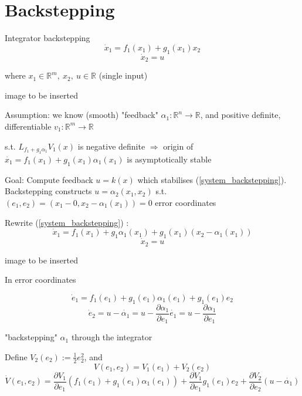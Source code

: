 \section{Backstepping}

Integrator backstepping 
\begin{equation}\label{system_backstepping}
\dot x_1 = f_1(x_1) + g_1(x_1)x_2 
\end{equation}
\begin{equation*}
\dot x_2 = u
\end{equation*}

where $x_1 \in \mathbb{R}^m, \ x_2, \ u \in \mathbb{R}$ (single input)

image to be inserted

Assumption: we know (smooth) "feedback" $\alpha_1: \mathbb{R}^n \to \mathbb{R}$, and positive definite, differentiable $v_1: \mathbb{R}^m \to \mathbb{R}$

s.t. $L_{f_1 + g_1\alpha_1}V_1(x)$ is negative definite $\Rightarrow$ origin of $\dot{x_1} = f_1(x_1) + g_1(x_1)\alpha_1(x_1)$ is asymptotically stable

Goal: Compute feedback $u = k(x)$ which stabilises (\ref{system_backstepping}). Backstepping constructs $u = \alpha_2(x_1, x_2)$ s.t. $(e_1, e_2) = (x_1 - 0, x_2 - \alpha_1(x_1))=0$ error coordinates

Rewrite (\ref{system_backstepping}) :
\begin{equation*}
\dot x_1 = f_1(x_1) + g_1\alpha_1(x_1) + g_1(x_1)(x_2 - \alpha_1(x_1))
\end{equation*}  
\begin{equation*}
\dot x_2 = u
\end{equation*}

image to be inserted

In error coordinates

\begin{equation}\label{error_coordinates_rewriting}
\dot e_1 = f_1(e_1) + g_1(e_1)\alpha_1(e_1) +g_1(e_1)e_2
\end{equation}
\begin{equation*}
\dot e_2 = u - \dot{\alpha_1} = u - \frac{\partial \alpha_1}{\partial e_1}\dot{e_1} = u - \frac{\partial \alpha_1}{\partial e_1}
\end{equation*}

"backstepping" $\alpha_1$ through the integrator

Define $V_2(e_2):= \frac{1}{2} e_2^2$, and 
\begin{equation*}
V(e_1, e_2) = V_1(e_1) + V_2(e_2)
\end{equation*}  
\begin{equation*}
\dot V(e_1, e_2) = \frac{\partial V_1}{\partial e_1}(f_1(e_1) + g_1(e_1)\alpha_1(e_1)) + \frac{\partial V_1}{\partial e_1}g_1(e_1)e_2 + \frac{\partial V_2}{\partial e_2}(u - \dot{\alpha_1})
\end{equation*}

